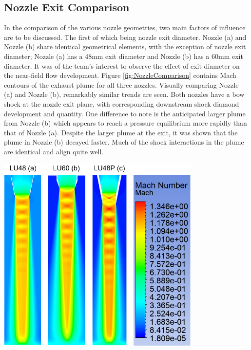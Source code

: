 \documentclass[12pt]{article} %
\begin{document}
\subsection{Nozzle Exit Comparison}
In the comparison of the various nozzle geometries, two main factors of influence are to be discussed. The first of which being nozzle exit diameter. Nozzle (a) and Nozzle (b) share identical geometrical elements, with the exception of nozzle exit diameter; Nozzle (a) has a 48mm exit diameter and Nozzle (b) has a 60mm exit diameter. It was of the team's interest to observe the effect of exit diameter on the near-field flow development. Figure \ref{fig:NozzleComparison} contains Mach contours of the exhaust plume for all three nozzles. Visually comparing Nozzle (a) and Nozzle (b), remarkably similar trends are seen. Both nozzles have a bow shock at the nozzle exit plane, with corresponding downstream shock diamond development and quantity. One difference to note is the anticipated larger plume from Nozzle (b) which appears to reach a pressure equilibrium more rapidly than that of Nozzle (a). Despite the larger plume at the exit, it was shown that the plume in Nozzle (b) decayed faster. Much of the shock interactions in the plume are identical and align quite well.

\begin{center}
    \includegraphics[width=4in]{NozzleCompare_Mach.PNG}
    \label{fig:NozzleComparison}
\end{center}
\end{document}
